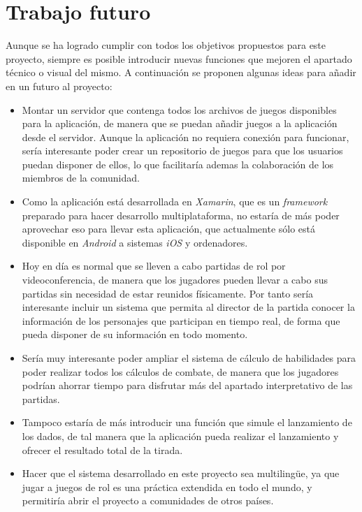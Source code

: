 
\section{Trabajo futuro}
Aunque se ha logrado cumplir con todos los objetivos propuestos para este proyecto, siempre es posible introducir nuevas 
funciones que mejoren el apartado técnico o visual del mismo. A continuación se proponen algunas ideas para añadir en 
un futuro al proyecto:

\begin{itemize}
    
    \item Montar un servidor que contenga todos los archivos de juegos disponibles para la aplicación, de manera 
    que se puedan añadir juegos a la aplicación desde el servidor. Aunque la aplicación no requiera conexión para funcionar, 
    sería interesante poder crear un repositorio de juegos para que los usuarios puedan disponer de ellos, lo que facilitaría 
    ademas la colaboración de los miembros de la comunidad.

    \item Como la aplicación está desarrollada en \textit{Xamarin}, que es un \textit{framework} preparado para hacer 
    desarrollo multiplataforma, no estaría de más poder aprovechar eso para llevar esta aplicación, que actualmente sólo 
    está disponible en \textit{Android} a sistemas \textit{iOS} y ordenadores.

    \item Hoy en día es normal que se lleven a cabo partidas de rol por videoconferencia, de manera que los jugadores 
    pueden llevar a cabo sus partidas sin necesidad de estar reunidos físicamente. Por tanto sería interesante incluir 
    un sistema que permita al director de la partida conocer la información de los personajes que participan en tiempo 
    real, de forma que pueda disponer de su información en todo momento.

    \item Sería muy interesante poder ampliar el sistema de cálculo de habilidades para poder realizar todos 
    los cálculos de combate, de manera que los jugadores podrían ahorrar tiempo para disfrutar más del apartado 
    interpretativo de las partidas.

    \item Tampoco estaría de más introducir una función que simule el lanzamiento de los dados, de tal 
    manera que la aplicación pueda realizar el lanzamiento y ofrecer el resultado total de la tirada.

    \item Hacer que el sistema desarrollado en este proyecto sea multilingüe, ya que jugar a juegos de rol es una 
    práctica extendida en todo el mundo, y permitiría abrir el proyecto a comunidades de otros países.

\end{itemize}